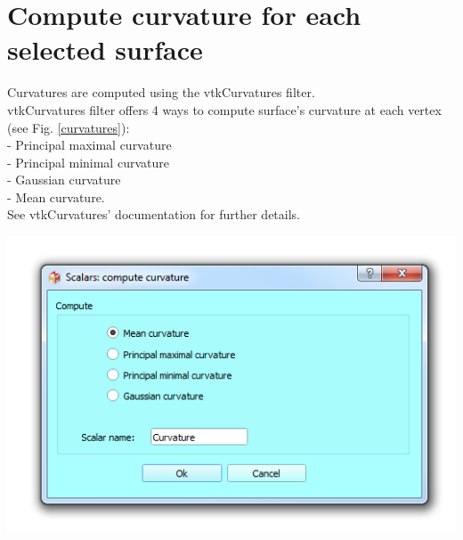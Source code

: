 \section{Compute curvature for each selected surface}
\noindent
\begin{minipage}{0.5\textwidth}
Curvatures are computed using the vtkCurvatures filter.\\
vtkCurvatures filter offers 4 ways to compute surface's
curvature at each vertex (see Fig. \ref{curvatures}):\\
- Principal maximal curvature\\
- Principal minimal curvature\\
- Gaussian curvature\\
- Mean curvature.\\
See vtkCurvatures' documentation for further details.

\end{minipage}    
\begin{minipage}{0.5\textwidth}\centering
  \includegraphics[scale=0.5]{images/11/curvature_dialog.png}
\label{curvature_window}
 \end{minipage} 
\noindent

